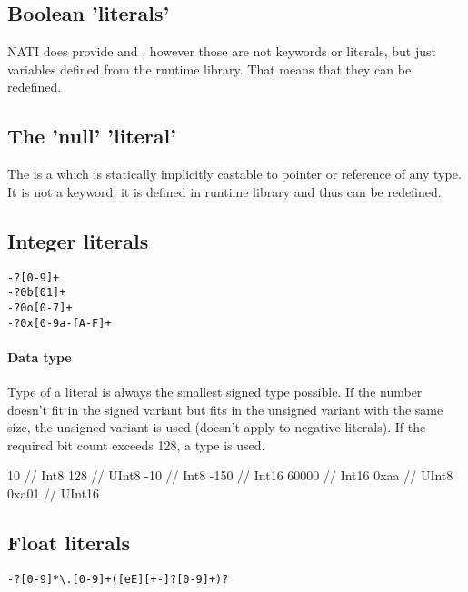 \subsection{Boolean 'literals'}
NATI does provide  and , however those are not keywords or literals, but just  variables defined from the runtime library. That means that they can be redefined.

\subsection{The 'null' 'literal'}
The  is a  which is statically implicitly castable to pointer or reference of any type. It is not a keyword; it is defined in runtime library and thus can be redefined.

\subsection{Integer literals}
\begin{grammar}
	 \verb|-?[0-9]+| \\
	 \verb|-?0b[01]+| \\
	 \verb|-?0o[0-7]+| \\
	 \verb|-?0x[0-9a-fA-F]+|
\end{grammar}

\paragraph{Data type} Type of a literal is always the smallest signed type possible. If the number doesn't fit in the signed variant but fits in the unsigned variant with the same size, the unsigned variant is used (doesn't apply to negative literals). If the required bit count exceeds 128, a  type is used.

\begin{code}
10 // Int8
128 // UInt8
-10 // Int8
-150 // Int16
60000 // Int16
0xaa // UInt8
0xa01 // UInt16
\end{code}

\subsection{Float literals}
\begin{grammar}
	 \verb|-?[0-9]*\.[0-9]+([eE][+-]?[0-9]+)?|
\end{grammar}

